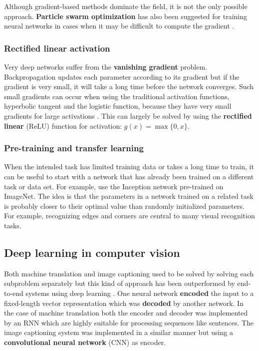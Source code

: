 Although gradient-based methods dominate the field, it is not the only possible approach. \textbf{Particle swarm optimization} has also been suggested for training neural networks in cases when it may be difficult to compute the gradient \cite[Chapter~5]{StochasticOpt}.

\subsubsection{Rectified linear activation}

Very deep networks suffer from the \textbf{vanishing gradient} problem.
Backpropagation updates each parameter according to its gradient but if the gradient is very small, it will take a long time before the network converges.
Such small gradients can occur when using the traditional activation functions, hyperbolic tangent and the logistic function, because they have very small gradients for large activations \cite{AlexNet}.
This can largely be solved by using the \textbf{rectified linear} (ReLU) function for activation: $g(x) = \max \{0, x\}$.


\subsubsection{Pre-training and transfer learning}

When the intended task has limited training data or takes a long time to train, it can be useful to start with a network that has already been trained on a different task or data set.
For example, \cite{SpatialTransformerNetworks} use the Inception network pre-trained on ImageNet.
The idea is that the parameters in a network trained on a related task is probably closer to their optimal value than randomly initialized parameters. For example, recognizing edges and corners are central to many visual recognition tasks.


\subsection{Deep learning in computer vision}

Both machine translation and image captioning used to be solved by solving each subproblem separately but this kind of approach has been outperformed by end-to-end systems using deep learning \cite{ShowAndTell}. One neural network \textbf{encoded} the input to a fixed-length vector representation which was \textbf{decoded} by another network. In the case of machine translation both the encoder and decoder was implemented by an RNN which are highly suitable for processing sequences like sentences. The image captioning system was implemented in a similar manner but using a \textbf{convolutional neural network} (CNN) as encoder.


